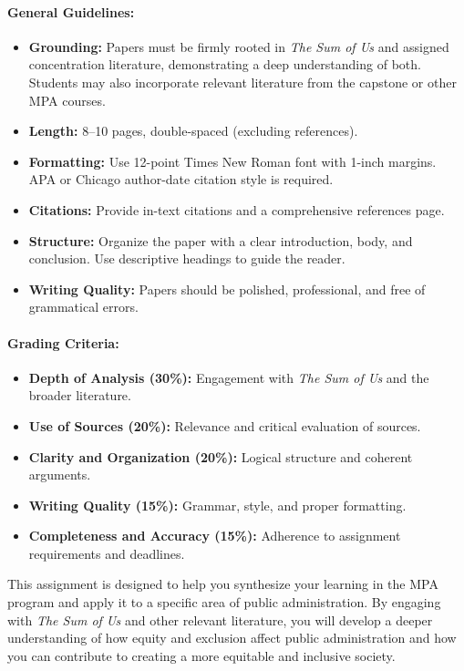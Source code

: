 \documentclass[11pt]{article}     %
\begin{document}
\paragraph*{General Guidelines:}
\begin{itemize}
    \item \textbf{Grounding:} Papers must be firmly rooted in \textit{The Sum of Us} and assigned concentration literature, demonstrating a deep understanding of both. Students may also incorporate relevant literature from the capstone or other MPA courses.
    \item \textbf{Length:} 8--10 pages, double-spaced (excluding references).
    \item \textbf{Formatting:} Use 12-point Times New Roman font with 1-inch margins. APA or Chicago author-date citation style is required.
    \item \textbf{Citations:} Provide in-text citations and a comprehensive references page.
    \item \textbf{Structure:} Organize the paper with a clear introduction, body, and conclusion. Use descriptive headings to guide the reader.
    \item \textbf{Writing Quality:} Papers should be polished, professional, and free of grammatical errors.
\end{itemize}

\paragraph*{Grading Criteria:}
\begin{itemize}
    \item \textbf{Depth of Analysis (30\%):} Engagement with \textit{The Sum of Us} and the broader literature.
    \item \textbf{Use of Sources (20\%):} Relevance and critical evaluation of sources.
    \item \textbf{Clarity and Organization (20\%):} Logical structure and coherent arguments.
    \item \textbf{Writing Quality (15\%):} Grammar, style, and proper formatting.
    \item \textbf{Completeness and Accuracy (15\%):} Adherence to assignment requirements and deadlines.
\end{itemize}
\noindent This assignment is designed to help you synthesize your learning in the MPA program and apply it to a specific area of public administration. By engaging with \textit{The Sum of Us} and other relevant literature, you will develop a deeper understanding of how equity and exclusion affect public administration and how you can contribute to creating a more equitable and inclusive society.
\end{document}
